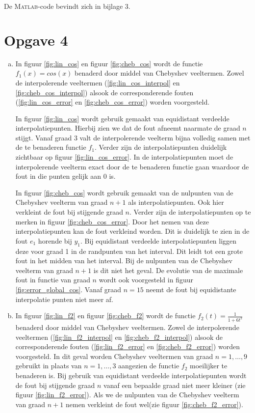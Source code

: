 \documentclass[a4paper]{article}
\newcommand{\opgave}[1]{\section*{Opgave #1}}
\begin{document}
De \textsc{Matlab}-code bevindt zich in bijlage 3.
\opgave{4}
\begin{enumerate}[a)] %
\item
In figuur \ref{fig:lin_cos} en figuur \ref{fig:cheb_cos} wordt de functie $f_{1}(x) = cos(x)$ benaderd door middel van Chebyshev veeltermen. Zowel de interpolerende veeltermen  (\ref{fig:lin_cos_interpol} en \ref{fig:cheb_cos_interpol}) alsook de corresponderende fouten (\ref{fig:lin_cos_error} en \ref{fig:cheb_cos_error}) worden voorgesteld. 

In figuur \ref{fig:lin_cos} wordt gebruik gemaakt van equidistant verdeelde interpolatiepunten. Hierbij zien we dat de fout afneemt naarmate de graad $n$ stijgt. Vanaf graad 3 valt de interpolerende veelterm bijna volledig samen met de te benaderen functie $f_{1}$. Verder zijn de interpolatiepunten duidelijk zichtbaar op figuur \ref{fig:lin_cos_error}. In de interpolatiepunten moet de interpolerende veelterm exact door de te benaderen functie gaan waardoor de fout in die punten gelijk aan 0 is.

In figuur \ref{fig:cheb_cos} wordt gebruik gemaakt van de nulpunten van de Chebyshev veelterm van graad $n+1$ als interpolatiepunten. Ook hier verkleint de fout bij stijgende graad $n$. Verder zijn de interpolatiepunten op te merken in figuur \ref{fig:cheb_cos_error}. Door het nemen van deze interpolatiepunten kan de fout verkleind worden. Dit is duidelijk te zien in de fout $e_{1}$ horende bij $y_{1}$. Bij equidistant verdeelde interpolatiepunten liggen deze voor graad 1 in de randpunten van het interval. Dit leidt tot een grote fout in het midden van het interval. Bij de nulpunten van de Chebyshev veelterm van graad $n+1$ is dit niet het geval. De evolutie van de maximale fout in functie van graad $n$ wordt ook voorgesteld in figuur \ref{fig:error_global_cos}. Vanaf graad $n = 15$ neemt de fout bij equidistante interpolatie punten niet meer af.
\item
In figuur \ref{fig:lin_f2} en figuur \ref{fig:cheb_f2} wordt de functie $f_{2}(t) = \frac{1}{1+6t^{2}}$ benaderd door middel van Chebyshev veeltermen. Zowel de interpolerende veeltermen  (\ref{fig:lin_f2_interpol} en \ref{fig:cheb_f2_interpol}) alsook de corresponderende fouten (\ref{fig:lin_f2_error} en \ref{fig:cheb_f2_error}) worden voorgesteld. In dit geval worden Chebyshev veeltermen van graad $n=1,\dots,9$ gebruikt in plaats van $n=1,\dots,3$ aangezien de functie $f_{2}$ moeilijker te benaderen is. Bij gebruik van equidistant verdeelde interpolatiepunten wordt de fout bij stijgende graad $n$ vanaf een bepaalde graad niet meer kleiner (zie figuur \ref{fig:lin_f2_error}). Als we de nulpunten van de Chebyshev veelterm van graad $n+1$ nemen verkleint de fout wel(zie figuur \ref{fig:cheb_f2_error}). 


\end{enumerate}
\end{document}
